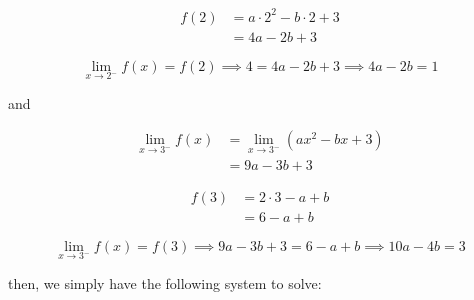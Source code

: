 \documentclass{../../../classes/anal}
\begin{document}
    \begin{equation}
        \begin{aligned}
            f(2) 
            &= a\cdot2^2-b\cdot2+3 \\
            &= 4a - 2b + 3
        \end{aligned}
    \end{equation}

    \begin{equation} \label{eq:p48:1}
        \lim_{x\to2^-}f(x) = f(2) \implies 4 = 4a - 2b + 3 \implies 4a - 2b = 1
    \end{equation}

    and

    \begin{equation}
        \begin{aligned}
            \lim_{x\to3^-}f(x)  
            &= \lim_{x\to3^-}(ax^2 - bx + 3) \\
            &= 9a - 3b + 3
        \end{aligned}
    \end{equation}

    \begin{equation}
        \begin{aligned}
            f(3)
            &= 2\cdot3 - a + b \\
            &= 6 - a + b
        \end{aligned}
    \end{equation}

    \begin{equation} \label{eq:p48:2}
        \lim_{x\to3^-}f(x)
        = f(3)
        \implies
        9a - 3b + 3
        = 6 - a + b
        \implies
        10a - 4b = 3
    \end{equation}
    
    then, we simply have the following system to solve:
\end{document}
